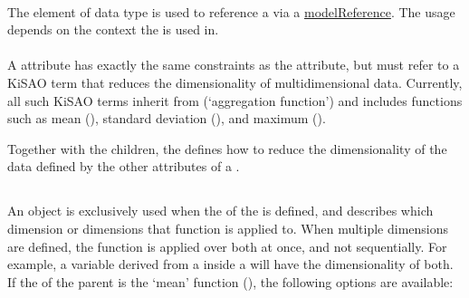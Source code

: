 \paragraph*{}
\label{sec:modelReferenceAttribute}
The  element of data type \SIdRef is used to reference a \Model via a \hyperref[sec:modelReference]{modelReference}. The usage depends on the context the \Variable is used in.



\begin{blockChanged}

\paragraph*{}
\label{sec:dimensionTerm}
A  attribute has exactly the same constraints as the  attribute, but must refer to a KiSAO term that reduces the dimensionality of multidimensional data.  Currently, all such KiSAO terms inherit from  (`aggregation function') and includes functions such as mean (), standard deviation (), and maximum ().

Together with the \AppliedDimension children, the  defines how to reduce the dimensionality of the data defined by the other attributes of a \Variable.



\subsection{}
\label{class:appliedDimension}
\label{class:listOfAppliedDimensions}

An \AppliedDimension object is exclusively used when the  of the \Variable is defined, and describes which dimension or dimensions that function is applied to.  When multiple dimensions are defined, the function is applied over both at once, and not sequentially.  For example, a variable derived from a \Task inside a \RepeatedTask will have the dimensionality of both.  If the  of the parent \Variable is the `mean' function (), the following options are available:


\end{blockChanged}
